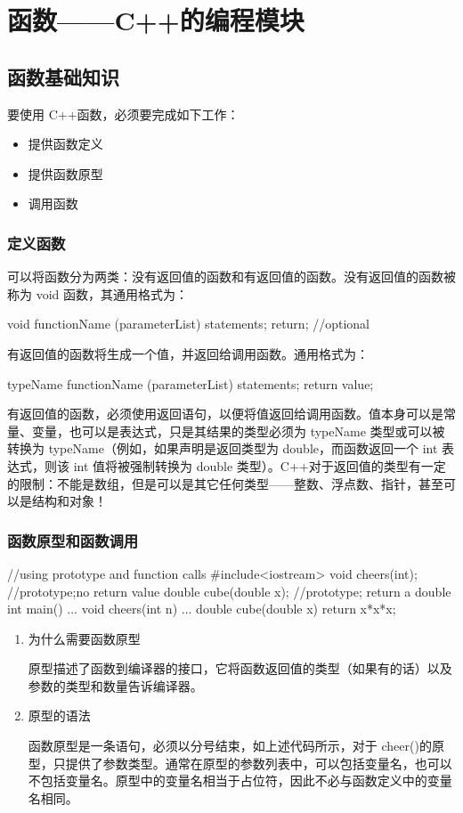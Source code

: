 \chapter{函数——C++的编程模块}
\section{函数基础知识}
要使用 C++函数，必须要完成如下工作：
\begin{itemize}
	\setlength{\itemsep}{0pt}
	\setlength{\parsep}{0pt}
	\setlength{\parskip}{0pt}
	\item 提供函数定义
	\item 提供函数原型
	\item 调用函数
\end{itemize}
\subsection{定义函数}
可以将函数分为两类：没有返回值的函数和有返回值的函数。没有返回值的函数被称为 void 函数，其通用格式为：
\begin{ccode}
void functionName (parameterList)
{
	statements;
	return;  //optional
}
\end{ccode}
有返回值的函数将生成一个值，并返回给调用函数。通用格式为：
\begin{ccode}
typeName functionName (parameterList)
{
	statements;
	return value;
}
\end{ccode}
有返回值的函数，必须使用返回语句，以便将值返回给调用函数。值本身可以是常量、变量，也可以是表达式，只是其结果的类型必须为 typeName 类型或可以被转换为 typeName（例如，如果声明是返回类型为 double，而函数返回一个 int 表达式，则该 int 值将被强制转换为 double 类型）。C++对于返回值的类型有一定的限制：不能是数组，但是可以是其它任何类型——整数、浮点数、指针，甚至可以是结构和对象！
\subsection{函数原型和函数调用}
\begin{ccode}
//using prototype and function calls
#include<iostream>
void cheers(int); //prototype;no return value
double cube(double x); //prototype; return a double
int main()
{
	...
} 
void cheers(int n)
{
	...
}
double cube(double x)
{
	return x*x*x;
}
\end{ccode}
\begin{enumerate}
	\item 为什么需要函数原型
	
	原型描述了函数到编译器的接口，它将函数返回值的类型（如果有的话）以及参数的类型和数量告诉编译器。
	\item 原型的语法
	
	函数原型是一条语句，必须以分号结束，如上述代码所示，对于 cheer()的原型，只提供了参数类型。通常在原型的参数列表中，可以包括变量名，也可以不包括变量名。原型中的变量名相当于占位符，因此不必与函数定义中的变量名相同。
\end{enumerate}
